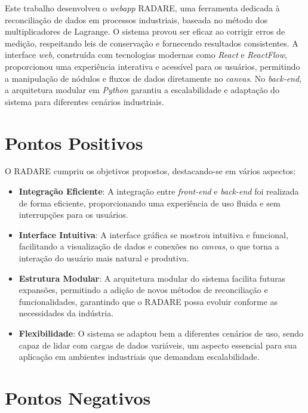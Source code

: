 \label{Cap:Conclusao}

Este trabalho desenvolveu o \textit{webapp} RADARE, uma ferramenta dedicada à reconciliação de dados em processos industriais, baseada no método dos multiplicadores de Lagrange. O sistema provou ser eficaz ao corrigir erros de medição, respeitando leis de conservação e fornecendo resultados consistentes. A interface \textit{web}, construída com tecnologias modernas como \textit{React} e \textit{ReactFlow}, proporcionou uma experiência interativa e acessível para os usuários, permitindo a manipulação de nódulos e fluxos de dados diretamente no \textit{canvas}. No \textit{back-end}, a arquitetura modular em \textit{Python} garantiu a escalabilidade e adaptação do sistema para diferentes cenários industriais.

\section{Pontos Positivos}

O RADARE cumpriu os objetivos propostos, destacando-se em vários aspectos:

\begin{itemize}
    \item \textbf{Integração Eficiente}: A integração entre \textit{front-end} e \textit{back-end} foi realizada de forma eficiente, proporcionando uma experiência de uso fluida e sem interrupções para os usuários.
    
    \item \textbf{Interface Intuitiva}: A interface gráfica se mostrou intuitiva e funcional, facilitando a visualização de dados e conexões no \textit{canvas}, o que torna a interação do usuário mais natural e produtiva.
    
    \item \textbf{Estrutura Modular}: A arquitetura modular do sistema facilita futuras expansões, permitindo a adição de novos métodos de reconciliação e funcionalidades, garantindo que o RADARE possa evoluir conforme as necessidades da indústria.
    
    \item \textbf{Flexibilidade}: O sistema se adaptou bem a diferentes cenários de uso, sendo capaz de lidar com cargas de dados variáveis, um aspecto essencial para sua aplicação em ambientes industriais que demandam escalabilidade.
\end{itemize}


\section{Pontos Negativos}

